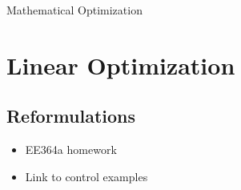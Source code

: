 \begin{chapter}{Mathematical Optimization}


    \section{Linear Optimization}

    \subsection{Reformulations}
    \begin{itemize}
        \item EE364a homework
        \item Link to control examples
    \end{itemize}
    

\end{chapter}